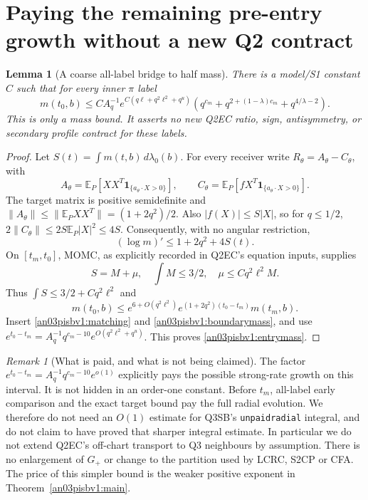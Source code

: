 \documentclass[11pt]{article}
\numberwithin{equation}{section}
\newtheorem{lemma}[theorem]{Lemma}
\theoremstyle{remark}\newtheorem{remark}[theorem]{Remark}
\newcommand{\E}{\mathbb E}
\newcommand{\dd}{\,d}
\newcommand{\one}{\mathbf1}
\begin{document}
\section{Paying the remaining pre-entry growth without a new Q2 contract}
\begin{lemma}[A coarse all-label bridge to half mass]
\label{an03pisbv1:bridge}
There is a model/S1 constant $C$ such that for every inner
$\pi$ label
\begin{equation}
 m(t_0,b)\le C A_q^{-1}
     e^{C(q\ell+q^2\ell^2+q^u)}
       \left(q^{c_m}
          +q^{2+(1-\lambda)c_m}
          +q^{4/\lambda-2}\right).
 \label{an03pisbv1:entrymass}
\end{equation}
This is only a mass bound. It asserts no new Q2EC ratio, sign,
antisymmetry, or secondary profile contract for these labels.
\end{lemma}
\begin{proof}
Let $S(t)=\int m(t,b)\dd\lambda_0(b)$. For every receiver write
$R_\theta=A_\theta-C_\theta$, with
\[
 A_\theta=\E_P[XX^T\one_{\{a_\theta\cdot X>0\}}],\qquad
 C_\theta=\E_P[fX^T\one_{\{a_\theta\cdot X>0\}}].
\]
The target matrix is positive semidefinite and
$\|A_\theta\|\le\|\E_PXX^T\|=(1+2q^2)/2$.
Also $|f(X)|\le S|X|$, so for $q\le1/2$,
$2\|C_\theta\|\le2S\E_P|X|^2\le4S$.
Consequently, with no angular restriction,
\begin{equation}
 (\log m)'\le1+2q^2+4S(t).                         \label{an03pisbv1:coarserate}
\end{equation}
On $[t_m,t_0]$, MOMC, as explicitly recorded in Q2EC's
equation inputs, supplies
\[
 S=M+\mu,\quad \int M\le3/2,\quad
 \mu\le Cq^2\ell^2M.
\]
Thus $\int S\le3/2+Cq^2\ell^2$ and
\[
 m(t_0,b)\le
 e^{6+O(q^2\ell^2)}e^{(1+2q^2)(t_0-t_m)}m(t_m,b).
\]
Insert \eqref{an03pisbv1:matching} and
\eqref{an03pisbv1:boundarymass}, and use
$e^{t_0-t_m}=A_q^{-1}q^{c_m-10}
 e^{O(q^2\ell^2+q^u)}$. This proves
\eqref{an03pisbv1:entrymass}.
\end{proof}

\begin{remark}[What is paid, and what is not being claimed]
The factor $e^{t_0-t_m}=A_q^{-1}q^{c_m-10}e^{o(1)}$
explicitly pays the possible strong-rate growth on this interval.
It is not hidden in an order-one constant.
Before $t_m$, all-label early comparison and the exact target
bound pay the full radial evolution.
We therefore do not need an $O(1)$ estimate for Q3SB's
\texttt{unpaidradial} integral, and do not claim to have proved that
sharper integral estimate. In particular we do not extend Q2EC's
off-chart transport to Q3 neighbours by assumption.
There is no enlargement of $G_+$ or change to the partition used by
LCRC, S2CP or CFA. The price of this simpler bound is the weaker
positive exponent in Theorem~\ref{an03pisbv1:main}.
\end{remark}
\end{document}
